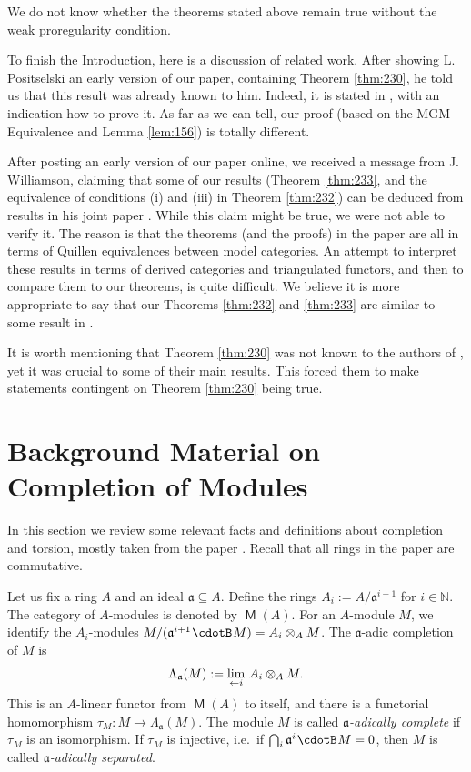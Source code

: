 \documentclass[10pt]{amsart}
\theoremstyle{definition}
\numberwithin{equation}{section}
\newcommand{\lto}{\leftarrow}
\newcommand{\sub}{\subseteq}
\newcommand{\cat}[1]{\operatorname{\mathsf{#1}}}
\newcommand{\cd}{\mspace{1.3mu}{\cdotB}\mspace{1.3mu}}
\newcommand{\mfrak}[1]{\mathfrak{#1}}
\newcommand{\La}{\Lambda}
\renewcommand{\a}{\mfrak{a}}
\newcommand{\N}{\mathbb{N}}
\newcommand{\ot}{\otimes}
\newcommand{\msp}[1]{\mspace{#1 mu}}
\begin{document}
We do not know whether the theorems stated above remain true without the weak
proregularity condition.

To finish the Introduction, here is a discussion of related work. After showing
L. Positselski an early
version of our paper, containing Theorem \ref{thm:230}, he told us that
this result was already known to him. Indeed, it is stated in
\cite[Example 5.2(2)]{Po1}, with an indication how to prove it. As far as we
can tell, our proof (based on the MGM Equivalence and Lemma \ref{lem:156}) is
totally different.

After posting an early version of our paper online, we received a message from
J. Williamson, claiming that some of our results (Theorem \ref{thm:233}, and
the equivalence of conditions (i) and (iii) in Theorem \ref{thm:232})
can be deduced from results in
his joint paper \cite{PW}. While this claim might be true, we were not able to
verify it. The reason is that the theorems (and the proofs) in the paper
\cite{PW} are all in terms of Quillen equivalences between model categories. An
attempt to interpret these results in terms of derived categories and
triangulated functors, and then to compare them to our theorems, is quite
difficult.
We believe it is more appropriate to say that our Theorems \ref{thm:232} and
\ref{thm:233} are similar to some result in \cite{PW}.

It is worth mentioning that Theorem \ref{thm:230} was not known to the authors
of \cite{PW}, yet it was crucial to some of their main results. This forced
them to make statements contingent on Theorem \ref{thm:230} being true.




\section{Background Material on Completion of Modules}
\label{sec:back}

In this section we review some relevant facts and definitions about completion
and torsion, mostly taken from the paper \cite{Ye1}.
Recall that all rings in the paper are commutative.

Let us fix a ring $A$ and an ideal $\a \sub A$. Define the rings
$A_i := A / \a^{i + 1}$ for $i \in \N$.
The category of $A$-modules is denoted by $\cat{M}(A)$.
For an $A$-module $M$, we identify the $A_i$-modules
$M / (\a^{i + 1} \cd M) = A_i \ot_A M$.
The $\a$-adic completion of $M$ is
\begin{equation} \label{eqn:255}
\La_{\a}(M) := \lim_{\lto i} \msp{3} A_i \ot_A M .
\end{equation}
This is an $A$-linear functor from $\cat{M}(A)$ to itself, and there is
a functorial homomorphism $\tau_M : M \to \La_{\a}(M)$.
The module $M$ is called {\em $\a$-adically complete} if $\tau_M$ is an
isomorphism. If $\tau_M$ is injective, i.e.\ if
$\bigcap_i \a^i \cd M = 0$, then $M$ is called {\em $\a$-adically separated}.
\end{document}
